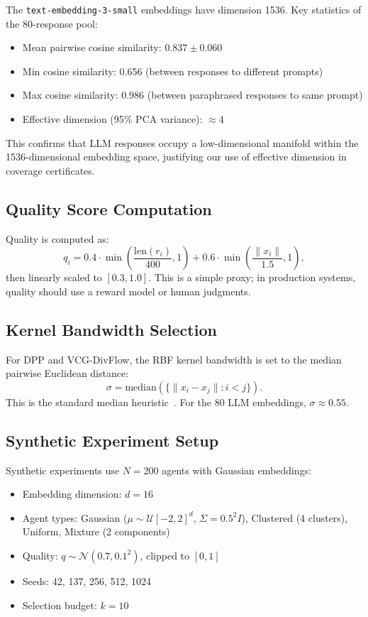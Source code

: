 \documentclass[10pt]{article}
\begin{document}
The \texttt{text-embedding-3-small} embeddings have dimension 1536.
Key statistics of the 80-response pool:
\begin{itemize}[leftmargin=*,itemsep=1pt]
\item Mean pairwise cosine similarity: $0.837 \pm 0.060$
\item Min cosine similarity: 0.656 (between responses to different prompts)
\item Max cosine similarity: 0.986 (between paraphrased responses to same prompt)
\item Effective dimension (95\% PCA variance): $\approx 4$
\end{itemize}

This confirms that LLM responses occupy a low-dimensional manifold within the 1536-dimensional embedding space, justifying our use of effective dimension in coverage certificates.

\subsection{Quality Score Computation}

Quality is computed as:
\begin{equation}
q_i = 0.4 \cdot \min\!\left(\frac{\text{len}(r_i)}{400}, 1\right) + 0.6 \cdot \min\!\left(\frac{\|x_i\|}{1.5}, 1\right),
\end{equation}
then linearly scaled to $[0.3, 1.0]$.
This is a simple proxy; in production systems, quality should use a reward model or human judgments.

\subsection{Kernel Bandwidth Selection}

For DPP and VCG-DivFlow, the RBF kernel bandwidth is set to the median pairwise Euclidean distance:
\[
\sigma = \text{median}(\{\|x_i - x_j\| : i < j\}).
\]
This is the standard median heuristic~\citep{kulesza2012determinantal}.
For the 80 LLM embeddings, $\sigma \approx 0.55$.

\subsection{Synthetic Experiment Setup}

Synthetic experiments use $N=200$ agents with Gaussian embeddings:
\begin{itemize}[leftmargin=*,itemsep=1pt]
\item Embedding dimension: $d = 16$
\item Agent types: Gaussian ($\mu \sim \mathcal{U}[-2, 2]^d$, $\Sigma = 0.5^2 I$), Clustered (4 clusters), Uniform, Mixture (2 components)
\item Quality: $q \sim \mathcal{N}(0.7, 0.1^2)$, clipped to $[0, 1]$
\item Seeds: 42, 137, 256, 512, 1024
\item Selection budget: $k = 10$
\end{itemize}
\end{document}
